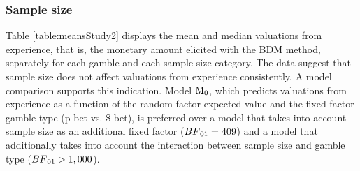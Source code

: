 \documentclass[a4paper, man, natbib, floatsintext]{apa6} %
\begin{document}
\subsubsection{Sample size}
Table \ref{table:meansStudy2} displays the mean and median valuations from experience, that is, the monetary amount elicited with the BDM method, separately for each gamble and each sample-size category. The data suggest that sample size does not affect valuations from experience consistently. A model comparison supports this indication. Model $\mathrm{M}\textsubscript{0}$, which predicts valuations from experience as a function of the random factor expected value and the fixed factor gamble type (p-bet vs. \$-bet), is preferred over a model that takes into account sample size as an additional fixed factor ($BF\textsubscript{01} = 409$) and a model that additionally takes into account the interaction between sample size and gamble type ($BF\textsubscript{01} > 1,000$). 
\newpage
\end{document}
